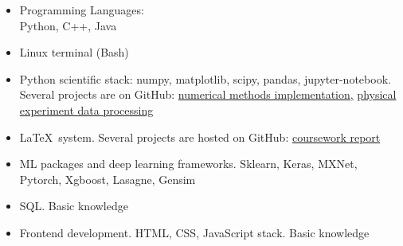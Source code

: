 \begin{itemize}
	\item Programming Languages: \\ 
	Python, C++, Java
	\item Linux terminal (Bash)
	\item Python scientific stack: 
	numpy, matplotlib, scipy, pandas, jupyter-notebook. Several projects are on GitHub: \href{https://github.com/stdereka/calc\_math\_hometask}{numerical methods implementation,} \href{https://github.com/stdereka/PRM\_MIPT}{physical experiment data processing}
	\item \LaTeX~system. Several projects are hosted on GitHub: \href{https://github.com/stdereka/yavor\_curse}{coursework report}
	\item ML packages and deep learning frameworks. Sklearn, Keras, MXNet, Pytorch, Xgboost, Lasagne,
	Gensim
	\item SQL. Basic knowledge
	\item Frontend development. HTML, CSS, JavaScript stack. Basic knowledge
\end{itemize}








